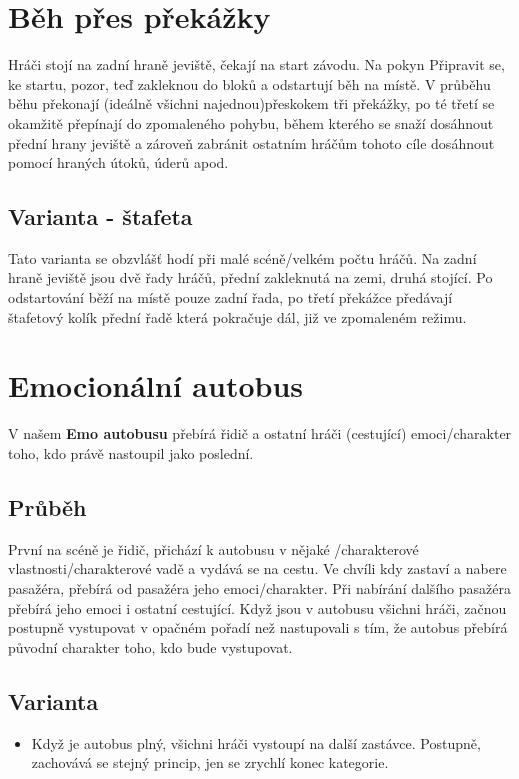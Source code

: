 \documentclass[main.tex]{subfiles}
\begin{document}
\needspace{5cm} \section{Běh přes překážky} \label{běh přes překážky} Hráči stojí na zadní hraně jeviště, čekají na start závodu. Na pokyn  Připravit se, ke startu, pozor, teď   zakleknou do bloků a odstartují běh na místě. V průběhu běhu překonají (ideálně všichni najednou)přeskokem tři překážky, po té třetí se okamžitě přepínají do zpomaleného pohybu, během kterého se snaží dosáhnout přední hrany jeviště a zároveň zabránit ostatním hráčům tohoto cíle dosáhnout pomocí hraných útoků, úderů apod. 
 
\subsection{Varianta - štafeta} Tato varianta se obzvlášť hodí při malé scéně/velkém počtu hráčů. 
Na zadní hraně jeviště jsou dvě řady hráčů, přední zakleknutá na zemi, druhá stojící. Po odstartování běží na místě pouze zadní řada, po třetí překážce předávají štafetový kolík přední řadě která pokračuje dál, již ve zpomaleném režimu. 
 
 
 
 
\needspace{5cm} \section{Emocionální autobus} \label{emocionální autobus}  
 
V našem \textbf{Emo autobusu}{} přebírá řidič a ostatní hráči (cestující) emoci/charakter toho, kdo právě nastoupil jako poslední.  
 
\subsection{Průběh} První na scéně je řidič, přichází k autobusu v nějaké /charakterové vlastnosti/charakterové vadě a vydává se na cestu. Ve chvíli kdy zastaví a nabere pasažéra, přebírá od pasažéra jeho emoci/charakter. Při nabírání dalšího pasažéra přebírá jeho emoci i ostatní cestující. Když jsou v autobusu všichni hráči, začnou postupně vystupovat v opačném pořadí než nastupovali s tím, že autobus přebírá původní charakter toho, kdo bude vystupovat. 
 
\subsection{Varianta} \begin{itemize}
\item Když je autobus plný, všichni hráči vystoupí na další zastávce. Postupně, zachovává se stejný princip, jen se zrychlí konec kategorie.
\end{itemize}
 
\end{document}
